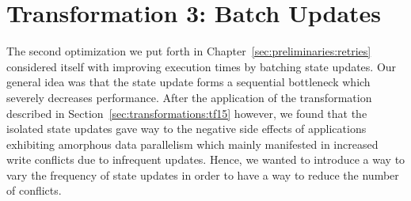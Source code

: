 \section{Transformation 3: Batch Updates}%
\label{sec:transformations:tf2}

The second optimization we put forth in Chapter~\ref{sec:preliminaries:retries} considered itself with improving execution times by batching state updates.
Our general idea was that the state update forms a sequential bottleneck which severely decreases performance.
After the application of the transformation described in Section~\ref{sec:transformations:tf15} however, we found that the isolated state updates gave way to the negative side effects of applications exhibiting amorphous data parallelism which mainly manifested in increased write conflicts due to infrequent updates.
Hence, we wanted to introduce a way to vary the frequency of state updates in order to have a way to reduce the number of conflicts.

